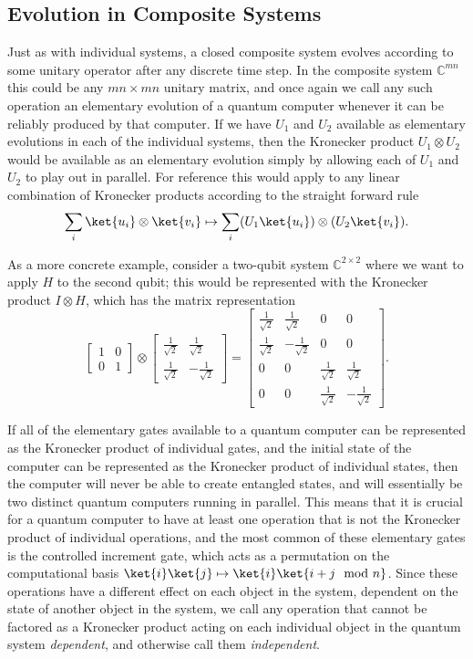\subsection{Evolution in Composite Systems}
Just as with individual systems, a closed composite system evolves according to some unitary operator after any discrete time step. In the composite system $\mathbb{C}^{mn}$ this could be any $mn \times mn$ unitary matrix, and once again we call any such operation an elementary evolution of a quantum computer whenever it can be reliably produced by that computer. If we have $U_1$ and $U_2$ available as elementary evolutions in each of the individual systems, then the Kronecker product $U_1 \otimes U_2$ would be available as an elementary evolution simply by allowing each of $U_1$ and $U_2$ to play out in parallel. For reference this would apply to any linear combination of Kronecker products according to the straight forward rule
\[\sum_i \ket{u_i}\otimes\ket{v_i} \mapsto \sum_i (U_1\ket{u_i})\otimes (U_2\ket{v_i}).\]

As a more concrete example, consider a two-qubit system $\mathbb{C}^{2\times 2}$ where we want to apply $H$ to the second qubit; this would be represented with the Kronecker product $I \otimes H$, which has the matrix representation
\[
\left[\begin{matrix}
	1&0\\
	0&1
\end{matrix}\right]
\otimes
\left[\begin{matrix}
	\frac{1}{\sqrt{2}}&\frac{1}{\sqrt{2}}\\
	\frac{1}{\sqrt{2}}&-\frac{1}{\sqrt{2}}
\end{matrix}\right]
=
\left[\begin{matrix}
	\frac{1}{\sqrt{2}}&\frac{1}{\sqrt{2}}&0&0\\
	\frac{1}{\sqrt{2}}&-\frac{1}{\sqrt{2}}&0&0\\
	0&0&\frac{1}{\sqrt{2}}&\frac{1}{\sqrt{2}}\\
	0&0&\frac{1}{\sqrt{2}}&-\frac{1}{\sqrt{2}}
\end{matrix}\right].
\]

If all of the elementary gates available to a quantum computer can be represented as the Kronecker product of individual gates, and the initial state of the computer can be represented as the Kronecker product of individual states, then the computer will never be able to create entangled states, and will essentially be two distinct quantum computers running in parallel. This means that it is crucial for a quantum computer to have at least one operation that is not the Kronecker product of individual operations, and the most common of these elementary gates is the controlled increment gate, which acts as a permutation on the computational basis $\ket{i}\ket{j} \mapsto \ket{i}\ket{i+j \mod n}$. Since these operations have a different effect on each object in the system, dependent on the state of another object in the system, we call any operation that cannot be factored as a Kronecker product acting on each individual object in the quantum system \emph{dependent}, and otherwise call them \emph{independent}.

